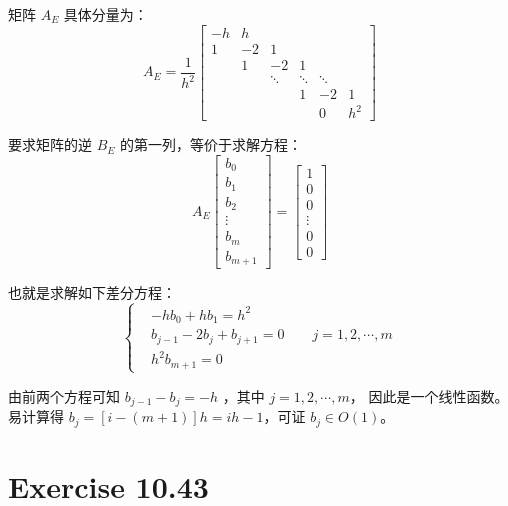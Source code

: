 \documentclass[a4paper]{article}
\begin{document}
\par 矩阵 $A_E$ 具体分量为：
\begin{equation}
    A_E=
    \frac{1}{h^2}
    \begin{bmatrix}
        -h  & h  &    &    &    & \\
        1   & -2 & 1  &    &    & \\
            & 1  & -2 & 1  &    & \\
            &    & \ddots & \ddots & \ddots & \\
            &    &    & 1  & -2 & 1\\
            &    &    &    & 0  & h^2
    \end{bmatrix}
\end{equation}
\par 要求矩阵的逆 $B_E$ 的第一列，等价于求解方程：
\begin{equation}
    A_E 
    \begin{bmatrix}
        b_{0} \\
        b_{1} \\
        b_{2} \\
        \vdots \\
        b_{m} \\
        b_{m+1}   
    \end{bmatrix}
    =
    \begin{bmatrix}
        1 \\
        0 \\
        0 \\
        \vdots \\
        0 \\
        0   
    \end{bmatrix}
\end{equation}
\par 也就是求解如下差分方程：
\begin{equation}
    \left\{
        \begin{aligned}
            &-hb_0+hb_1 = h^2 \\
            &b_{j-1}-2b_j+b_{j+1} = 0 \qquad j=1,2,\cdots,m \\
            &h^2b_{m+1} = 0
        \end{aligned}
    \right.
\end{equation}
\par 由前两个方程可知 $b_{j-1}-b_j =-h$ ，其中 $j=1,2,\cdots,m$，
因此是一个线性函数。易计算得 
$b_j = [i-(m+1)]h=ih-1$，可证 $b_j \in O(1)$。

\section*{Exercise 10.43}
\end{document}
